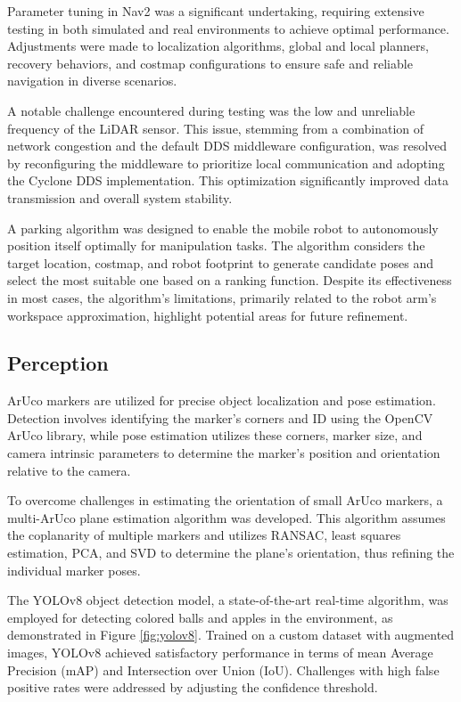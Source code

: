 Parameter tuning in Nav2 was a significant undertaking, requiring extensive testing in both simulated and real 
environments to achieve optimal performance. Adjustments were made to localization algorithms, global and local
planners, recovery behaviors, and costmap configurations to ensure safe and reliable navigation in diverse 
scenarios.

A notable challenge encountered during testing was the low and unreliable frequency of the LiDAR sensor. 
This issue, stemming from a combination of network congestion and the default DDS middleware configuration, 
was resolved by reconfiguring the middleware to prioritize local communication and adopting the Cyclone DDS 
implementation. This optimization significantly improved data transmission and overall system stability.

A parking algorithm was designed to enable the mobile robot to autonomously position itself optimally
for manipulation tasks. The algorithm considers the target location, costmap, and robot footprint to generate 
candidate poses and select the most suitable one based on a ranking function. Despite its effectiveness in most 
cases, the algorithm's limitations, primarily related to the robot arm's workspace approximation, highlight
potential areas for future refinement.

\subsection{Perception}

ArUco markers are utilized for precise object localization and pose estimation. 
Detection involves identifying the marker's corners and ID using the OpenCV ArUco library, while pose estimation
utilizes these corners, marker size, and camera intrinsic parameters to determine the marker's position and
orientation relative to the camera.

To overcome challenges in estimating the orientation of small ArUco markers, a multi-ArUco plane estimation 
algorithm was developed. This algorithm assumes the coplanarity of multiple markers and utilizes RANSAC, 
least squares estimation, PCA, and SVD to determine the plane's orientation, thus refining the individual 
marker poses.

The YOLOv8 object detection model, a state-of-the-art real-time algorithm, was employed for detecting colored
balls and apples in the environment, as demonstrated in Figure \ref{fig:yolov8}.
Trained on a custom dataset with augmented images, YOLOv8 achieved 
satisfactory performance in terms of mean Average Precision (mAP) and Intersection over Union (IoU).
Challenges with high false positive rates were addressed by adjusting the confidence threshold.

